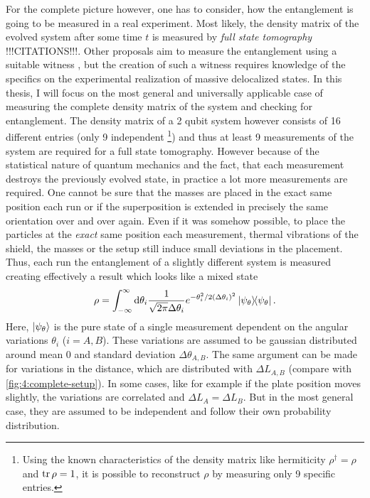 For the complete picture however, one has to consider, how the entanglement is going to be measured in a real experiment.
Most likely, the density matrix of the evolved system after some time $t$ is measured by \emph{full state tomography} !!!CITATIONS!!!. Other proposals aim to measure the entanglement using a suitable witness \cite{Bose_2017,Chevalier_2020}, but the creation of such a witness requires knowledge of the specifics on the experimental realization of massive delocalized states.
In this thesis, I will focus on the most general and universally applicable case of measuring the complete density matrix of the system and checking for entanglement.
The density matrix of a 2 qubit system however consists of 16 different entries (only 9 independent \footnote{Using the known characteristics of the density matrix like hermiticity $\rho^\dagger = \rho$ and $\tr \rho = 1$, it is possible to reconstruct $\rho$ by measuring only 9 specific entries.}) and thus at least 9 measurements of the system are required for a full state tomography. However because of the statistical nature of quantum mechanics and the fact, that each measurement destroys the previously evolved state, in practice a lot more measurements are required.
One cannot be sure that the masses are placed in the exact same position each run or if the superposition is extended in precisely the same orientation over and over again. Even if it was somehow possible, to place the particles at the \textit{exact} same position each measurement, thermal vibrations of the shield, the masses or the setup still induce small deviations in the placement.
Thus, each run the entanglement of a slightly different system is measured creating effectively a result which looks like a mixed state
\begin{equation}
  \rho = \int_{-\infty}^{\infty} \dd \theta_i \frac{1}{\sqrt{2\pi}\Delta \theta_i} e^{-\theta_i^2/2(\Delta \theta_i)^2} \ketbra{\psi_\theta} .
\end{equation}
Here, $\ket{\psi_\theta}$ is the pure state of a single measurement dependent on the angular variations $\theta_i$ ($i=A,B$). These variations are assumed to be gaussian distributed around mean $0$ and standard deviation $\Delta \theta_{A,B}$.
The same argument can be made for variations in the distance, which are distributed with $\Delta L_{A,B}$ (compare with \cref{fig:4:complete-setup}).
In some cases, like for example if the plate position moves slightly, the variations are correlated and $\Delta L_A = \Delta L_B$. But in the most general case, they are assumed to be independent and follow their own probability distribution.

